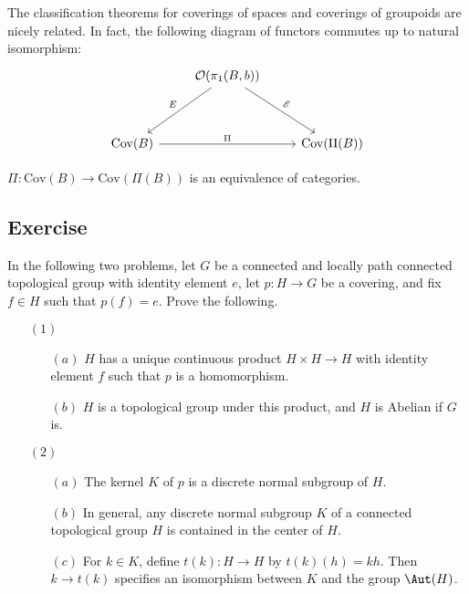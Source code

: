 The classification theorems for coverings of spaces and coverings of groupoids
are nicely related. In fact, the following diagram of functors commutes up to natural isomorphism:
\[\begin{tikzcd}
&\mathcal{O}(\pi_1(B,b))\ar[ldd,swap,"E"]\ar[rdd,"\mathscr{E}"]\\
&&\\
\mathrm{Cov}(B)\ar[rr,"\Pi"]&&\mathrm{Cov}(\Pi(B))
\end{tikzcd}\]
\begin{corollary}
$\Pi:\mathrm{Cov}(B)\to\mathrm{Cov}(\Pi(B))$ is an equivalence of categories.
\end{corollary}
\subsection{Exercise}
\begin{exercise}
In the following two problems, let $G$ be a connected and locally path connected topological group with identity element $e$, let $p:H\to G$ be a covering, and fix $f\in H$ such that $p(f)=e$. Prove the following.
\begin{itemize}
\item[$(1)$]
\begin{itemize}
\item[$(a)$] $H$ has a unique continuous product $H\times H\to H$ with identity
element $f$ such that $p$ is a homomorphism.
\item[$(b)$] $H$ is a topological group under this product, and $H$ is Abelian if $G$ is.
\end{itemize}
\item[$(2)$]
\begin{itemize}
\item[$(a)$] The kernel $K$ of $p$ is a discrete normal subgroup of $H$.
\item[$(b)$] In general, any discrete normal subgroup $K$ of a connected topological group $H$ is contained in the center of $H$.
\item[$(c)$] For $k\in K$, define $t(k):H\to H$ by $t(k)(h)=kh$. Then $k\to t(k)$ specifies an isomorphism between $K$ and the group $\Aut(H)$.
\end{itemize}
\end{itemize}
\end{exercise}

